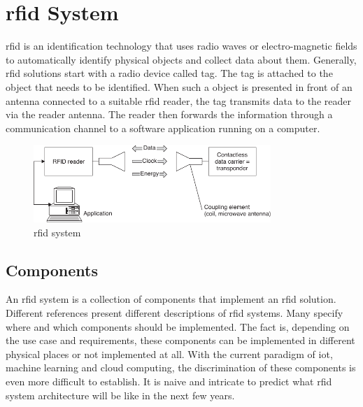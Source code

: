 \section{\ac{rfid} System}


\ac{rfid} is an identification technology that uses radio waves or electro-magnetic fields to automatically identify physical objects and collect data about them.
Generally, \ac{rfid} solutions start with a radio device called tag. The tag is attached to the object that needs to be identified. When such a object is presented in front of an antenna connected to a suitable \ac{rfid} reader, the tag transmits data to the reader via the reader antenna. The reader then forwards the information through a communication channel to a software application running on a computer.

\begin{figure}[!ht]
    \centering
    \includegraphics[width=0.8\textwidth]{./figs/02-state-of-the-art/rfid_system.pdf}
    \caption{\ac{rfid} system~\cite{finkenzellerRFIDHandbookFundamentals2003}} 
    \label{fig:rfidsystem}
\end{figure}

\subsection{Components}

An \ac{rfid} system is a collection of components that implement an \ac{rfid} solution.
Different references present different descriptions of \ac{rfid} systems. Many specify where and which components should be implemented.
The fact is, depending on the use case and requirements, these components can be implemented in different physical places or not implemented at all. With the current paradigm of \ac{iot}, machine learning and cloud computing, the discrimination of these components is even more difficult to establish. It is naive and intricate to predict what \ac{rfid} system architecture will be like in the next few years.

